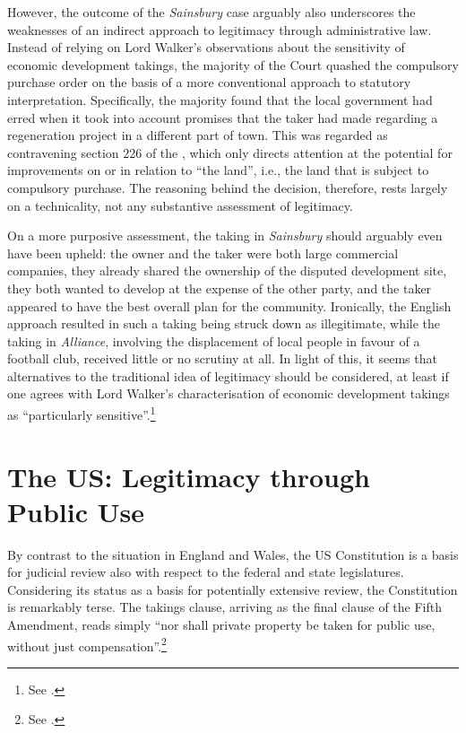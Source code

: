 However, the outcome of the {\it Sainsbury} case arguably also underscores the weaknesses of an indirect approach to legitimacy through administrative law. Instead of relying on Lord Walker's observations about the sensitivity of economic development takings, the majority of the Court quashed the compulsory purchase order on the basis of a more conventional approach to statutory interpretation. Specifically, the majority found that the local government had erred when it took into account promises that the taker had made regarding a regeneration project in a different part of town. This was regarded as contravening section 226 of the \cite{tcpa90}, which only directs attention at the potential for improvements on or in relation to ``the land'', i.e., the land that is subject to compulsory purchase. The reasoning behind the decision, therefore, rests largely on a technicality, not any substantive assessment of legitimacy.

On a more purposive assessment, the taking in {\it Sainsbury} should arguably even have been upheld: the owner and the taker were both large commercial companies, they already shared the ownership of the disputed development site, they both wanted to develop at the expense of the other party, and the taker appeared to have the best overall plan for the community. Ironically, the English approach resulted in such a taking being struck down as illegitimate, while the taking in {\it Alliance}, involving the displacement of local people in favour of a football club, received little or no scrutiny at all. In light of this, it seems that alternatives to the traditional idea of legitimacy should be considered, at least if one agrees with Lord Walker's characterisation of economic development takings as ``particularly sensitive''.\footnote{See \cite[82]{sainsbury10}.}


\section{The US: Legitimacy through Public Use}\label{sec:3:3}

By contrast to the situation in England and Wales, the US Constitution is a basis for judicial review also with respect to the federal and state legislatures. Considering its status as a basis for potentially extensive review, the Constitution is remarkably terse. The takings clause, arriving as the final clause of the Fifth Amendment, reads simply ``nor shall private property be taken for public use, without just compensation''.\footnote{See \cite{fifth}.}

